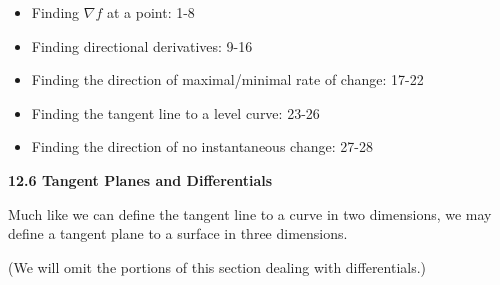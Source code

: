 \documentclass[12pt]{article}
\theoremstyle{plain}
\theoremstyle{definition}
\theoremstyle{remark}
\begin{document}
\begin{itemize}
		\begin{itemize}
		\item Finding $\nabla f$ at a point: 1-8
		\item Finding directional derivatives: 9-16
		\item Finding the direction of maximal/minimal rate of change: 17-22
		\item Finding the tangent line to a level curve: 23-26
		\item Finding the direction of no instantaneous change: 27-28
		\end{itemize}
	
	\end{itemize}
	
	\newpage
	
	\centerline{\bf 12.6 Tangent Planes and Differentials}
	
	Much like we can define the tangent line to a curve in two dimensions, we may define a tangent plane to a surface in three dimensions.
	
	(We will omit the portions of this section dealing with differentials.)
		
\end{document}
